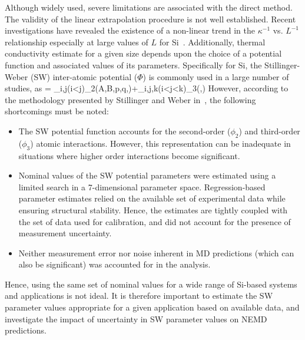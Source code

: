 Although widely used, severe limitations are associated with the direct method.
The validity of the linear extrapolation procedure is not well established. Recent
investigations have revealed the existence of a non-linear trend in the $\kappa^{-1}$ vs. $L^{-1}$
relationship especially at large values of $L$ for Si~\cite{Sellan:2010}. Additionally, 
thermal conductivity estimate for a given size depends upon the choice of a potential
function and associated values of its parameters. Specifically for Si, the Stillinger-Weber (SW)
inter-atomic potential ($\Phi$) is commonly used in a large number of studies, as
%
\be
\Phi = \sum\limits_{i,j(i<j)}\phi_2(A,B,p,q,\alpha)\hspace{1mm}+\sum\limits_{i,j,k(i<j<k)}\phi_3(\lambda,\gamma)
\ee
%
However, according
to the methodology presented by Stillinger and Weber in~\cite{Stillinger:1985},
the following shortcomings must be noted:
%
\begin{itemize}
\item The SW potential function accounts for the second-order ($\phi_2$) and
third-order ($\phi_3$) atomic 
interactions. However, this representation can be inadequate in situations where 
higher order interactions become significant.  
\item Nominal values of the SW potential parameters were estimated using a 
limited search in a 7-dimensional parameter space. Regression-based parameter
estimates relied on the available set of experimental data while ensuring structural
stability. Hence, the estimates are tightly coupled with the set of data used for
calibration, and did not account for the presence of measurement uncertainty. 
\item Neither measurement error nor noise inherent in MD predictions (which can also be
significant) was accounted for in the analysis. 
\end{itemize}
%
Hence, using the same set of nominal values for a wide range of Si-based systems and
applications is not ideal. It is therefore important to estimate the SW parameter values
appropriate for a given application based on available data, and investigate the impact
of uncertainty in SW parameter values on NEMD predictions. 


